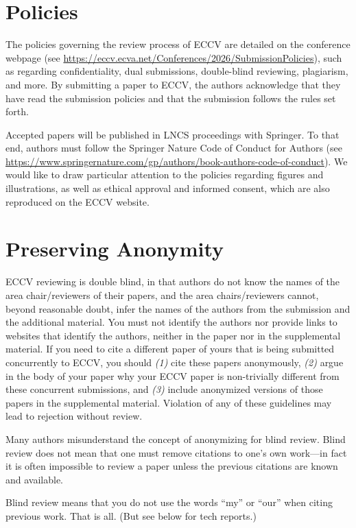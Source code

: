 \documentclass[runningheads]{llncs}
\begin{document}
\section{Policies}
The policies governing the review process of ECCV \ECCVyear{} are detailed on the conference webpage (see \url{ https://eccv.ecva.net/Conferences/2026/SubmissionPolicies}), such as regarding confidentiality, dual submissions, double-blind reviewing, plagiarism, and more. 
By submitting a paper to ECCV, the authors acknowledge that they have read the submission policies and that the submission follows the rules set forth.

Accepted papers will be published in LNCS proceedings with Springer.
To that end, authors must follow the Springer Nature Code of Conduct for Authors (see \url{https://www.springernature.com/gp/authors/book-authors-code-of-conduct}).
We would like to draw particular attention to the policies regarding figures and illustrations, as well as ethical approval and informed consent, which are also reproduced on the ECCV website.


\section{Preserving Anonymity}
\label{sec:blind}
ECCV reviewing is double blind, in that authors do not know the names of the area chair/reviewers of their papers, and the area chairs/reviewers cannot, beyond reasonable doubt, infer the names of the authors from the submission and the additional material. 
You must not identify the authors nor provide links to websites that identify the authors, neither in the paper nor in the supplemental material.
If you need to cite a different paper of yours that is being submitted concurrently to ECCV, you should \emph{(1)} cite these papers anonymously, \emph{(2)} argue in the body of your paper why your ECCV paper is non-trivially different from these concurrent submissions, and \emph{(3)} include anonymized versions of those papers in the supplemental material.
Violation of any of these guidelines may lead to rejection without review. 

Many authors misunderstand the concept of anonymizing for blind review.
Blind review does not mean that one must remove citations to one's own work---in fact it is often impossible to review a paper unless the previous citations are known and available.

Blind review means that you do not use the words ``my'' or ``our'' when citing previous work.
That is all.
(But see below for tech reports.)
\end{document}
